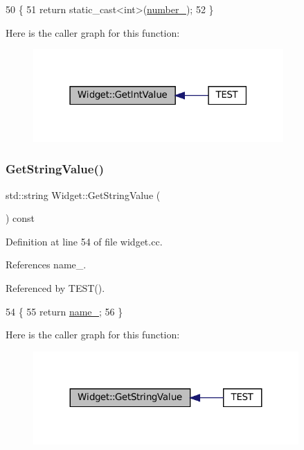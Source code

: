 \begin{DoxyCode}
50                               \{
51   \textcolor{keywordflow}{return} \textcolor{keyword}{static\_cast<}\textcolor{keywordtype}{int}\textcolor{keyword}{>}(\hyperlink{classWidget_a27a2b3fd66372d5731fa9a6bcaab755b}{number\_});
52 \}
\end{DoxyCode}
Here is the caller graph for this function\+:
\nopagebreak
\begin{figure}[H]
\begin{center}
\leavevmode
\includegraphics[width=271pt]{classWidget_a15e7d0423020a7a98063a749fb97bdd3_icgraph}
\end{center}
\end{figure}
\mbox{\label{classWidget_a7a6e3a7fca3a9373f631c94dc1494d22}} 
\subsubsection{\texorpdfstring{Get\+String\+Value()}{GetStringValue()}}
{\footnotesize\ttfamily std\+::string Widget\+::\+Get\+String\+Value (\begin{DoxyParamCaption}{ }\end{DoxyParamCaption}) const}



Definition at line 54 of file widget.\+cc.



References name\+\_\+.



Referenced by T\+E\+S\+T().


\begin{DoxyCode}
54                                        \{
55   \textcolor{keywordflow}{return} \hyperlink{classWidget_a1d2f74810f3f912270a681e0671a7a55}{name\_};
56 \}
\end{DoxyCode}
Here is the caller graph for this function\+:
\nopagebreak
\begin{figure}[H]
\begin{center}
\leavevmode
\includegraphics[width=287pt]{classWidget_a7a6e3a7fca3a9373f631c94dc1494d22_icgraph}
\end{center}
\end{figure}


